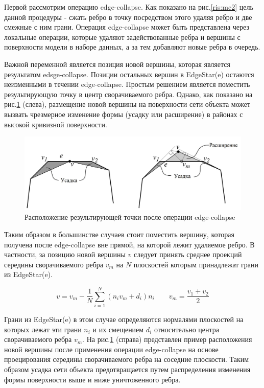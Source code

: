 \documentclass[14pt]{article}
\numberwithin{figure}{section}
\numberwithin{equation}{section}
\begin{document}
Первой рассмотрим операцию edge-collapse. Как показано на рис.\ref{ris:mc2} цель данной процедуры - сжать ребро в точку посредством этого удаляя ребро и две смежные с ним грани. Операция edge-collapse может быть представлена через локальные операции, которые удаляют задействованные ребра и вершины с поверхности модели в наборе данных, а за тем добавляют новые ребра в очередь.

Важной переменной является позиция новой вершины, которая является результатом edsge-collapse. Позиции остальных вершин в EdgeStar(e) остаются неизменными в течении edge-collapse. Простым решением является поместить результирующую точку в центр сворачиваемого ребра. Однако, как показано на рис.\ref{ris:mc5} (слева), размещение новой вершины на поверхности сети объекта может вызвать чрезмерное изменение формы (усадку или расширение) в районах с высокой кривизной поверхности.

\begin{figure}
	\begin{center}
		\includegraphics[scale = 0.47]{mc5.JPG}
		\caption{Расположение результирующей точки после операции edge-collapse}
		\label{ris:mc5}
	\end{center}
\end{figure}

Таким образом в большинстве случаев стоит поместить вершину, которая получена после edge-collapse вне прямой, на которой лежит удаляемое ребро. В частности, за позицию новой вершины $v$ следует принять среднее проекций середины сворачиваемого ребра $v_m$ на $N$ плоскостей которым принадлежат грани из EdgeStar(e).

\begin{equation}
	v = v_m - \frac{1}{N} \sum\limits_{i = 1}^N (n_i v_m + d_i)n_i \qquad v_m = \frac{v_1 + v_2}{2}
\end{equation}

Грани из EdgeStar(e) в этом случае определяются нормалями плоскостей на которых лежат эти грани $n_i$ и их смещением $d_i$ относительно центра сворачиваемого ребра $v_m$. На рис.\ref{ris:mc5} (справа) представлен пример расположения новой вершины после применения операции edge-collapse на основе проецирования середины сворачиваемого ребра на соседние плоскости. Таким образом усадка сети объекта предотвращается путем распределения изменения формы поверхности выше и ниже уничтоженного ребра.
\end{document}
